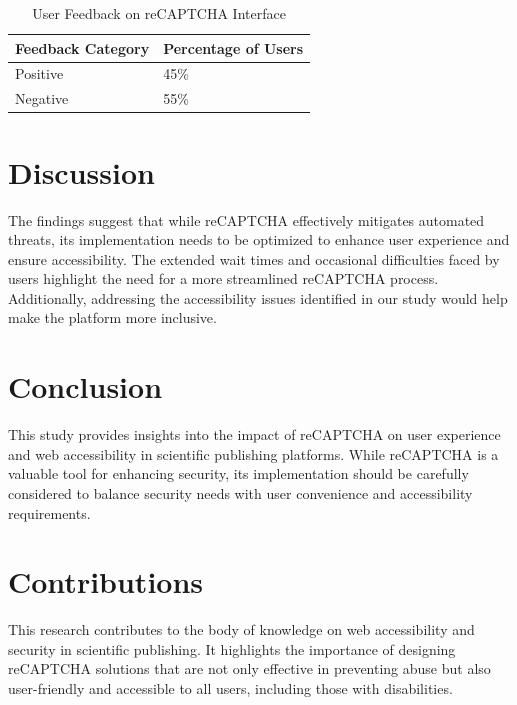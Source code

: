 \documentclass{article}
\begin{document}
\begin{table}[ht]
\centering
\caption{User Feedback on reCAPTCHA Interface}
\label{tab:user_feedback}
\begin{tabular}{@{}ll@{}}
\toprule
\textbf{Feedback Category} & \textbf{Percentage of Users} \\ \midrule
Positive & 45\% \\
Negative & 55\% \\ \bottomrule
\end{tabular}
\end{table}

\section{Discussion}
The findings suggest that while reCAPTCHA effectively mitigates automated threats, its implementation needs to be optimized to enhance user experience and ensure accessibility. The extended wait times and occasional difficulties faced by users highlight the need for a more streamlined reCAPTCHA process. Additionally, addressing the accessibility issues identified in our study would help make the platform more inclusive.

\section{Conclusion}
This study provides insights into the impact of reCAPTCHA on user experience and web accessibility in scientific publishing platforms. While reCAPTCHA is a valuable tool for enhancing security, its implementation should be carefully considered to balance security needs with user convenience and accessibility requirements.

\section{Contributions}
This research contributes to the body of knowledge on web accessibility and security in scientific publishing. It highlights the importance of designing reCAPTCHA solutions that are not only effective in preventing abuse but also user-friendly and accessible to all users, including those with disabilities.
\end{document}
